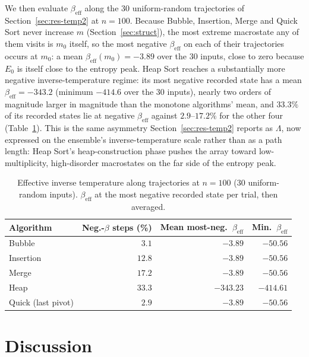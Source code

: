 \documentclass[10pt,journal]{IEEEtran}
\begin{document}
We then evaluate $\beta_{\mathrm{eff}}$ along the 30 uniform-random trajectories of Section~\ref{sec:res-temp2} at $n=100$. Because Bubble, Insertion, Merge and Quick Sort never increase $m$ (Section~\ref{sec:struct}), the most extreme macrostate any of them visits is $m_0$ itself, so the most negative $\beta_{\mathrm{eff}}$ on each of their trajectories occurs at $m_0$: a mean $\beta_{\mathrm{eff}}(m_0)=-3.89$ over the 30 inputs, close to zero because $E_0$ is itself close to the entropy peak. Heap Sort reaches a substantially more negative inverse-temperature regime: its most negative recorded state has a mean $\beta_{\mathrm{eff}}=-343.2$ (minimum $-414.6$ over the 30 inputs), nearly two orders of magnitude larger in magnitude than the monotone algorithms' mean, and $33.3\%$ of its recorded states lie at negative $\beta_{\mathrm{eff}}$ against $2.9$--$17.2\%$ for the other four (Table~\ref{tab:traj-temp}). This is the same asymmetry Section~\ref{sec:res-temp2} reports as $\Lambda$, now expressed on the ensemble's inverse-temperature scale rather than as a path length: Heap Sort's heap-construction phase pushes the array toward low-multiplicity, high-disorder macrostates on the far side of the entropy peak.

\begin{table}[!t]
\centering
\caption{Effective inverse temperature along trajectories at $n=100$ (30 uniform-random inputs). $\beta_{\mathrm{eff}}$ at the most negative recorded state per trial, then averaged.}
\label{tab:traj-temp}
\scriptsize
\setlength{\tabcolsep}{3.5pt}
\begin{tabular}{@{}lrrr@{}}
\toprule
Algorithm & Neg.-$\beta$ steps (\%) & Mean most-neg.\ $\beta_{\mathrm{eff}}$ & Min.\ $\beta_{\mathrm{eff}}$ \\
\midrule
Bubble & $3.1$ & $-3.89$ & $-50.56$ \\
Insertion & $12.8$ & $-3.89$ & $-50.56$ \\
Merge & $17.2$ & $-3.89$ & $-50.56$ \\
Heap & $33.3$ & $-343.23$ & $-414.61$ \\
Quick (last pivot) & $2.9$ & $-3.89$ & $-50.56$ \\
\bottomrule
\end{tabular}
\end{table}
\FloatBarrier

\section{Discussion}
\end{document}
